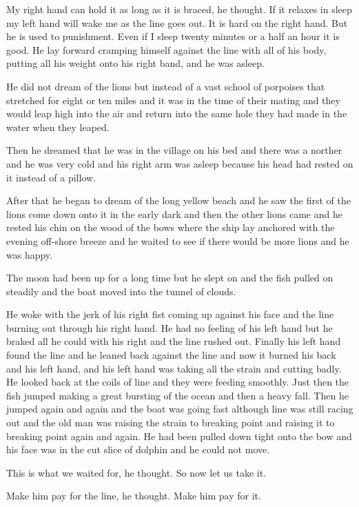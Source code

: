 \documentclass[fontset=ubuntu,zihao=-4]{ctexrep}
\begin{document}
My right hand can hold it as long as it is braced, he thought. If it relaxes
in sleep my left hand will wake me as the line goes out. It is hard on the
right hand. But he is used to punishment. Even if I sleep twenty minutes or
a half an hour it is good. He lay forward cramping himself against the line
with all of his body, putting all his weight onto his right band, and he was
asleep.

He did not dream of the lions but instead of a \gls{vast} school of
porpoises that \gls{stretched} for eight or ten miles and it was in the time of
their \gls{mating} and they would leap high into the air and return into the same
hole they had made in the water when they leaped.

Then he dreamed that he was in the village on his bed and there was a
\gls{norther} and he was very cold and his right arm was asleep because his
head had rested on it instead of a pillow.

After that he began to dream of the long yellow beach and he saw the first
of the lions come down onto it in the early dark and then the other lions
came and he rested his chin on the wood of the bows where the ship lay
anchored with the evening off-shore breeze and he waited to see if there
would be more lions and he was happy.

The moon had been up for a long time but he slept on and the fish pulled on
steadily and the boat moved into the \gls{tunnel} of clouds.

He woke with the jerk of his right \gls{fist} coming up against his face and
the line burning out through his right hand. He had no feeling of his left
hand but he \gls{braked} all he could with his right and the line rushed
out. Finally his left hand found the line and he leaned back against the
line and now it burned his back and his left hand, and his left hand was
taking all the strain and cutting badly. He looked back at the coils of line
and they were feeding smoothly. Just then the fish jumped making a great
\gls{bursting} of the ocean and then a heavy fall. Then he jumped again and
again and the boat was going fast although line was still racing out and the
old man was raising the strain to breaking point and raising it to breaking
point again and again. He had been pulled down tight onto the bow and his
face was in the cut slice of dolphin and he could not move.

This is what we waited for, he thought. So now let us take it.

Make him pay for the line, he thought. Make him pay for it.
\end{document}
